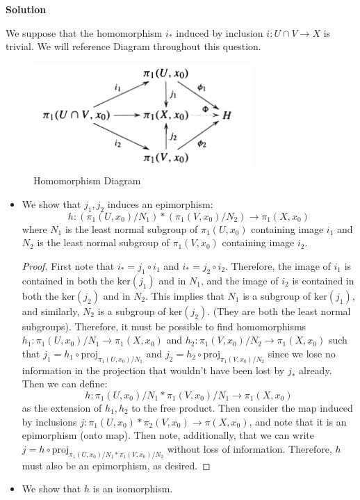 \documentclass[12pt]{article}
\newcounter{AnswerCounter}
\newcounter{SubAnswerCounter}
\newenvironment{answer}[0]{
  \setcounter{SubAnswerCounter}{1}
  \bigskip
  \textbf{Solution \arabic{AnswerCounter}}
  \\
  \begin{small}
}{
  \end{small}
  \stepcounter{AnswerCounter}
}
\begin{document}
\begin{answer}[Page 433, \#1]
We suppose that the homomorphism $i_*$ induced by inclusion $i: U \cap V \to X$ is trivial. We will reference Diagram throughout this question.
\begin{figure}[h!]
\centering
\caption{Homomorphism Diagram}
\label{diag:homomorphisms}
\includegraphics{map_diagram.png}
\end{figure}
\begin{itemize}
\item We show that $j_1, j_2$ induces an epimorphism:
$$
h: (\pi_1(U,x_0)/N_1) * (\pi_1(V,x_0)/N_2) \to \pi_1(X,x_0)
$$
where $N_1$ is the least normal subgroup of $\pi_1(U,x_0)$ containing image $i_1$ and $N_2$ is the least normal subgroup of $\pi_1(V,x_0)$ containing image $i_2$.
\begin{proof}
First note that $i_* = j_1 \circ i_1$ and $i_* = j_2 \circ i_2$. Therefore, the image of $i_1$ is contained in both the $\text{ker}(j_1)$ and in $N_1$, and the image of $i_2$ is contained in both the $\text{ker}(j_2)$ and in $N_2$. This implies that $N_1$ is a subgroup of $\text{ker}(j_1)$, and similarly, $N_2$ is a subgroup of $\text{ker}(j_2)$. (They are both the least normal subgroups). Therefore, it must be possible to find homomorphisms $h_1: \pi_1(U,x_0)/N_1 \to \pi_1(X,x_0)$ and $h_2: \pi_1(V,x_0)/N_2 \to \pi_1(X,x_0)$ such that $j_1 = h_1 \circ \text{proj}_{\pi_1(U,x_0)/N_1}$ and $j_2 = h_2 \circ \text{proj}_{\pi_1(V,x_0)/N_2}$ since we lose no information in the projection that wouldn't have been lost by $j_*$ already. Then we can define:
$$
h: \pi_1(U,x_0)/N_1 * \pi_1(V,x_0)/N_1 \to \pi_1(X,x_0)
$$
as the extension of $h_1,h_2$ to the free product. Then consider the map induced by inclusions $j: \pi_1(U,x_0) * \pi_2(V,x_0) \to \pi(X,x_0)$, and note that it is an epimorphism (onto map). Then note, additionally, that we can write $j = h \circ \text{proj}_{\pi_1(U,x_0)/N_1 * \pi_1(V,x_0)/N_2}$ without loss of information. Therefore, $h$ must also be an epimorphism, as desired.
\end{proof}
\item We show that $h$ is an isomorphism.

\end{itemize}
\end{answer}
\end{document}

